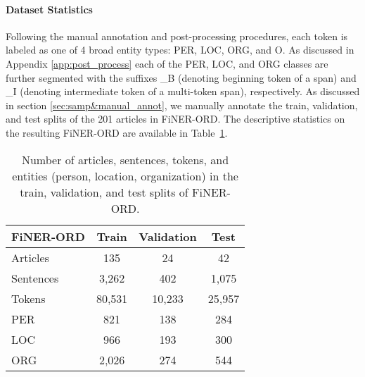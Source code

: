 \documentclass[11pt]{article}
\begin{document}
\paragraph{Dataset Statistics}


 Following the manual annotation and post-processing procedures, each token is labeled as one of 4 broad entity types: PER, LOC, ORG, and O. As discussed in Appendix \ref{app:post_process} each of the PER, LOC, and ORG classes are further segmented with the suffixes \_B (denoting beginning token of a span) and \_I (denoting intermediate token of a multi-token span), respectively. As discussed in section \ref{sec:samp&manual_annot}, we manually annotate the train, validation, and test splits of the 201 articles in FiNER-ORD. The descriptive statistics on the resulting FiNER-ORD are available in Table~\ref{tb:dataset_finerord}. 

\begin{table}
\centering
\footnotesize
\begin{tabular}{lccc}
\hline
\textbf{FiNER-ORD} & \textbf{Train} & \textbf{Validation} & \textbf{Test}\\
\hline
Articles & 135 & 24 & 42\\
Sentences & 3,262 & 402 & 1,075\\
Tokens & 80,531 & 10,233 & 25,957\\
PER & 821 & 138 & 284\\
LOC & 966 & 193 & 300\\
ORG & 2,026 & 274 & 544\\
\hline
\end{tabular}
\caption{Number of articles, sentences, tokens, and entities (person, location, organization) in the train, validation, and test splits of FiNER-ORD.}
\label{tb:dataset_finerord}
\end{table}

\end{document}
